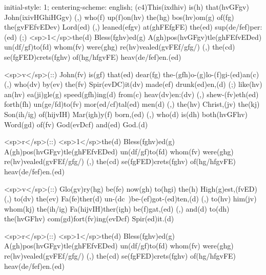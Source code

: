 initial-style: 1;
centering-scheme: english;
(c4)This(ixdhiv) is(h) that(hvGFgv) John(ixivHGhiHGgv) (,) who(f) up(f)on(hv) the(hg) bos(hv)om(g) of(fg) the(gvFEfvEDev) Lord(ed) (,) leaned(efgv) at(ghFEfgFE) the(ed) sup(de/fef)per:(ed) (;) <sp>1</sp>the(d) Bless(fghv)ed(g) A(gh)pos(hvGFgv)tle(ghFEfvEDed) un(df/gf)to(fd) whom(fv) were(ghg) re(hv)vealed(gvFEf/gfg/) (,) the(cd) se(fgFED)crets(fghv) of(hg/hfgvFE) heav(de/fef)en.(ed) 

<sp>v</sp>(::) John(fv) is(gf) that(ed) dear(fg) the-(gfh)o-(g)lo-(f)gi-(ed)an(c) (,) who(dv) by(ev) the(fv) Spir(evDC)it(dv) made(ef) drunk(ed)en,(d) (;) like(hv) an(hv) ea(ji)gle(g) speed(gfh)ing(d) from(c) heav(dv)en:(dv) (,) shew-(fv)eth(ed) forth(fh) un(ge/fd)to(fv) mor(ed/cf)tal(ed) men(d) (,) the(hv) Christ,(jv) the(kj) Son(ih/ig) of(hijvIH) Mar(igh)y(f) born,(ed) (,) who(d) is(dh) both(hvGFhv) Word(gd) of(fv) God(evDcf) and(ed) God.(d)

<sp>r</sp>(::) <sp>1</sp>the(d) Bless(fghv)ed(g) A(gh)pos(hvGFgv)tle(ghFEfvEDed) un(df/gf)to(fd) whom(fv) were(ghg) re(hv)vealed(gvFEf/gfg/) (,) the(cd) se(fgFED)crets(fghv) of(hg/hfgvFE) heav(de/fef)en.(ed) 

<sp>v</sp>(::) Glo(gv)ry(hg) be(fe) now(gh) to(hgi) the(h) High(g)est,(fvED) (,) to(dv) the(ev) Fa(fe)ther(d) un-(dc~)be-(ef)got-(ed)ten,(d) (,) to(hv) him(jv) whom(kj) the(ih/ig) Fa(hijvIH)ther(igh) be(f)gat,(ed) (,) and(d) to(dh) the(hvGFhv) com(gd)fort(fv)ing(evDcf) Spir(ed)it.(d)

<sp>r</sp>(::) <sp>1</sp>the(d) Bless(fghv)ed(g) A(gh)pos(hvGFgv)tle(ghFEfvEDed) un(df/gf)to(fd) whom(fv) were(ghg) re(hv)vealed(gvFEf/gfg/) (,) the(cd) se(fgFED)crets(fghv) of(hg/hfgvFE) heav(de/fef)en.(ed) 
